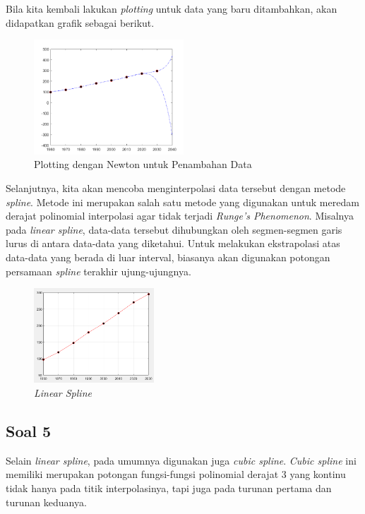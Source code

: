 \documentclass[11pt, a4paper, onecolumn, oneside, final]{report}
\begin{document}
Bila kita kembali lakukan \textit{plotting} untuk data yang baru ditambahkan, akan didapatkan grafik sebagai berikut.

\begin{figure}[h!]
    \centering
    \includegraphics[width=0.5\textwidth]{assets/newtonPlot.png}
    \caption{Plotting dengan Newton untuk Penambahan Data}
\end{figure}

Selanjutnya, kita akan mencoba menginterpolasi data tersebut dengan metode \textit{spline}. Metode ini merupakan salah satu metode yang digunakan untuk meredam derajat polinomial interpolasi agar tidak terjadi \textit{Runge's Phenomenon}. Misalnya pada \textit{linear spline}, data-data tersebut dihubungkan oleh segmen-segmen garis lurus di antara data-data yang diketahui. Untuk melakukan ekstrapolasi atas data-data yang berada di luar interval, biasanya akan digunakan potongan persamaan \textit{spline} terakhir ujung-ujungnya.

\begin{figure}[h!]
    \centering
    \includegraphics[width=0.4\textwidth]{assets/LinearSpline.png}
    \caption{\textit{Linear Spline}}
\end{figure}

\subsection*{Soal 5}

Selain \textit{linear spline}, pada umumnya digunakan juga \textit{cubic spline}. \textit{Cubic spline} ini memiliki merupakan potongan fungsi-fungsi polinomial derajat 3 yang kontinu tidak hanya pada titik interpolasinya, tapi juga pada turunan pertama dan turunan keduanya.
\end{document}
